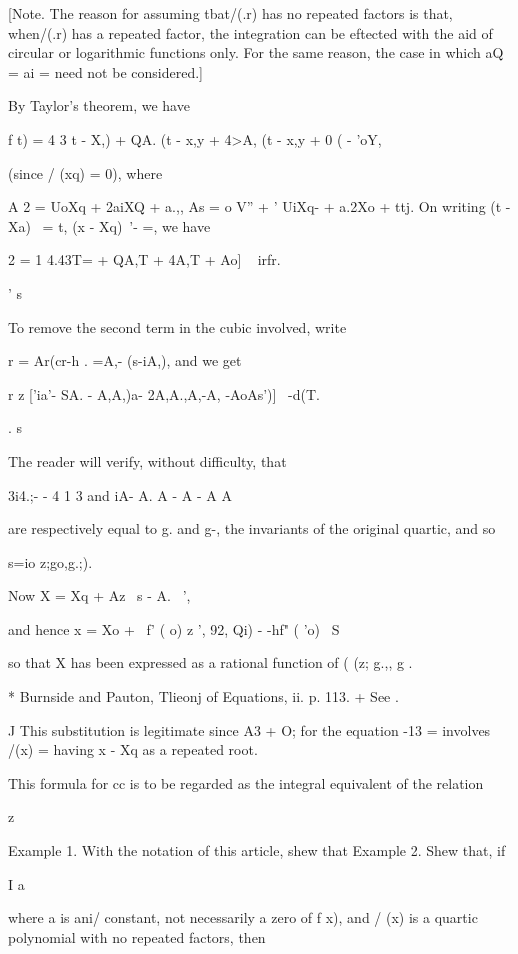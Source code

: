 {[Note. The reason for assuming tbat/(.r) has no repeated factors is
that, when/(.r) has a repeated factor, the integration can be eftected
with the aid of circular or logarithmic functions only. For the same
reason, the case in which aQ = ai = need not be considered.]

By Taylor's theorem, we have

f t) = 4 3 t - X,) + QA. (t - x,y + 4>A, (t - x,y + 0 ( - 'oY,

(since / (xq) = 0), where

A 2 = UoXq + 2aiXQ + a.,, As = o V'' + ' UiXq- + a.2Xo + ttj. On
writing (t - Xa)~ = t, (x - Xq)~'- =, we have

2 = 1 4.43T= + QA,T + 4A,T + Ao] ~ irfr.

' s

To remove the second term in the cubic involved, write

r = Ar(cr-h . =A,- (s-iA,), and we get

r z ['ia'- SA. - A,A,)a- 2A,A.,A,-A, -AoAs')]~ -d(T.

. s

The reader will verify, without difficulty, that

3i4.;- - 4 1 3 and iA- A. A - A - A A

are respectively equal to g. and g-, the invariants of the original
quartic, and so

s=io z;go,g.;).

Now X = Xq + Az \ s - A. ~',

and hence x = Xo + \ f' ( o) z ', 92, Qi) - -hf" ( 'o) ~S

so that X has been expressed as a rational function of ( (z; g.,, g .

* Burnside and Pauton, Tlieonj of Equations, ii. p. 113. + See .

J This substitution is legitimate since A3 + O; for the equation -13 =
involves /(x) = having x - Xq as a repeated root.

%
%

This formula for cc is to be regarded as the integral equivalent of
the relation

z

Example 1. With the notation of this article, shew that Example 2.
Shew that, if

I a

where a is ani/ constant, not necessarily a zero of f x), and / (x) is
a quartic polynomial with no repeated factors, then

}
